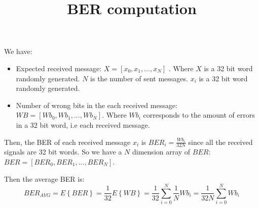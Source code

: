 \documentclass{article}
\title{BER computation}
\begin{document}
We have:
\begin{itemize}

  \item Expected received message: \(X = [x_{0}, x_{1}, ..., x_{N}]\) . Where \(X\) is a 32 bit word randomly generated. \(N\) is the number of sent messages. \(x_{i}\) is a 32 bit word randomly generated. 
  
  \item Number of wrong bits in the each received message: \(WB = [Wb_{0}, Wb_{1} , ..., Wb_{N}]\). Where \(Wb_{i} \) corresponds to the amount of errors in a 32 bit word, i.e each received message.

\end{itemize}

Then, the BER of each received message \(x_{i}\) is \(BER_{i} = \frac{Wb_{i}}{32N}\) since all the received signals are 32 bit words. So we have a \(N\) dimension array of \(BER\): \(BER = [BER_{0}, BER_{1}, ...,BER_{N}]\).

Then the average BER is:
\[BER_{AVG} = E\left\{BER\right\} = \frac{1}{32}E\left\{WB\right\}=\frac{1}{32}\sum_{i=0}^{N}\frac{1}{N}Wb_{i} = \frac{1}{32N}\sum_{i=0}^{N}Wb_{i}\]
\end{document}

